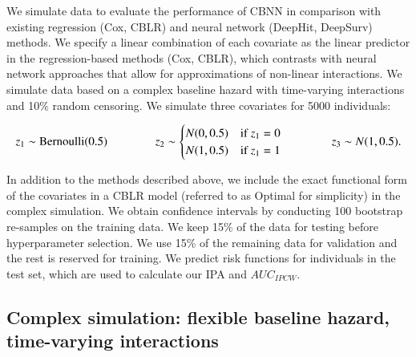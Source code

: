\documentclass[preprint,12pt,authoryear]{elsarticle}
\begin{document}
We simulate data to evaluate the performance of CBNN in comparison with existing regression (Cox, CBLR) and neural network (DeepHit, DeepSurv)
methods. We specify a linear combination of each covariate as the linear predictor in the regression-based methods (Cox, CBLR), which contrasts
with neural network approaches that allow for approximations of non-linear interactions. We simulate data based on a complex baseline hazard with time-varying
interactions and 10\% random censoring. We simulate three covariates for 5000 individuals:


\begin{equation*}
\resizebox{\hsize}{!}{$
z_{1} \sim \textrm{Bernoulli}(0.5) \qquad \qquad %
z_{2} \sim \begin{cases}
 N(0,0.5) & \textrm{if } z_{1}=0\\ 
 N(1,0.5) & \textrm{if } z_{1}=1
\end{cases} \qquad \qquad
z_{3} \sim N(1,0.5).$}
\end{equation*}

In addition to the methods described above, we include the exact functional form of the covariates in a CBLR model (referred to as Optimal for simplicity)
in the complex simulation. We obtain confidence intervals by conducting 100 bootstrap re-samples on the training data. We keep 15\% of the data for testing before
hyperparameter selection. We use 15\% of the remaining data for validation and the rest is reserved for training. We predict risk functions for individuals in
the test set, which are used to calculate our IPA and $AUC_{IPCW}$. 





\hypertarget{complex-simulation-flexible-baseline-hazard-time-varying-interactions}{%
\subsection{Complex simulation: flexible baseline hazard, time-varying
interactions}\label{complex-simulation-flexible-baseline-hazard-time-varying-interactions}}
\end{document}
